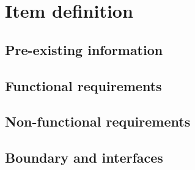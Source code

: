 \section{Item definition}

\subsection{Pre-existing information}

\subsection{Functional requirements}
%
%

\subsection{Non-functional requirements}
%
%
%

\subsection{Boundary and interfaces}
%
%
